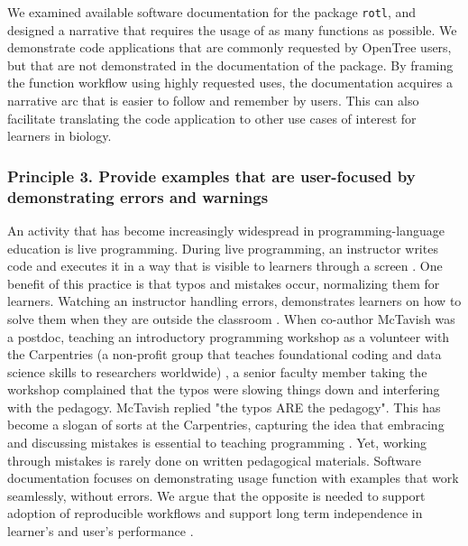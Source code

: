 \documentclass[12pt]{article}
\begin{document}
We examined available software documentation for the package \texttt{rotl}, and designed a narrative that requires the usage of as many functions as possible.
We demonstrate code applications that are commonly requested by OpenTree users, but that are not demonstrated in the documentation of the package.
By framing the function workflow using highly requested uses, the documentation acquires a narrative arc that is easier to follow and remember by users.
This can also facilitate translating the code application to other use cases of interest for learners in biology.


\subsubsection*{Principle 3. Provide examples that are user-focused by demonstrating errors and warnings}


An activity that has become increasingly widespread in programming-language education is live programming.
During live programming, an instructor writes code and executes it in a way that is visible to learners through a screen \citep{guzdial2013lure, selvaraj2021live}.
One benefit of this practice is that typos and mistakes occur, normalizing them for learners.
Watching an instructor handling errors, demonstrates learners on how to solve them when they are outside the classroom \citep{shannon2015live, nederbragt2020ten}.
When co-author McTavish was a postdoc, teaching an introductory programming workshop as a volunteer with the Carpentries (a non-profit group that teaches foundational coding and data science skills to researchers worldwide) \citep{wilson2006swc, SWCwebsite},
a senior faculty member taking the workshop complained that the typos were slowing things down and interfering with the pedagogy.
McTavish replied "the typos ARE the pedagogy".
This has become a slogan of sorts at the Carpentries, capturing the idea that embracing and discussing mistakes is essential to teaching programming \citep{wilson2019teaching}.
Yet, working through mistakes is rarely done on written pedagogical materials.
Software documentation focuses on demonstrating usage function with examples that work seamlessly, without errors.
We argue that the opposite is needed to support adoption of reproducible workflows and support long term independence in learner's and user's performance \citep{gaspar2007restoring, steele2014error}.
\end{document}
